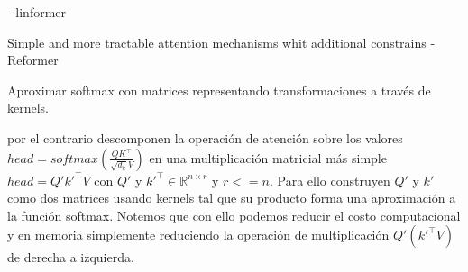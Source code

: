- linformer

Simple and more tractable attention mechanisms whit additional constrains
- Reformer



Aproximar softmax con matrices representando transformaciones a través de kernels.

\citeauthor*{DBLP:journals/corr/abs-2009-14794} por el contrario descomponen la operación de atención
sobre los valores $head = softmax(\frac{QK^\top}{\sqrt{d_k} V})$ en una multiplicación matricial más simple
$head = Q'k'^\top V$ con $Q'$ y $k'^\top \in \mathbb{R}^{n \times r}$ y $r<=n$.
Para ello construyen $Q'$ y $k'$ como dos matrices usando kernels tal que su producto forma una
aproximación a la función softmax. Notemos que con ello podemos reducir el costo computacional y en
memoria simplemente reduciendo la operación de multiplicación $Q'(k'^\top V)$ de derecha a izquierda.
